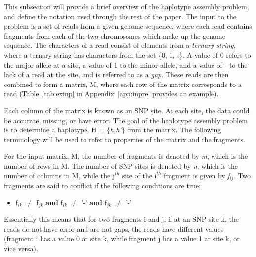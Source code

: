 \documentclass[10pt,twocolumn]{article}
\begin{document}
This subsection will provide a brief overview of the haplotype assembly problem, and define the
notation used through the rest of the paper. The input to the problem is a set of reads from a given genome
sequence, where each read contains fragments from each of the two chromosomes which make up the genome
sequence. The characters of a read consist of elements from a \textit{ternary string}, where a ternary
string has characters from the set \{0, 1, -\}. A value of 0 refers to the major allele
at a site, a value of 1 to the minor allele, and a value of - to the lack of a read at the site, and is
referred to as a \textit{gap}. These reads are then combined to form a matrix, M, where each row of the 
matrix corresponds to a read (Table~\ref{tab:exinp} in Appendix~\ref{app:inpre} provides an example). 

Each column of the matrix is known as an SNP site. At each site, the data could be accurate, missing, or have
error. The goal of the haplotype assembly problem is to determine a haplotype, H = \{\textit{h,h'}\}
from the matrix. The following terminology will be used to refer to properties of the matrix and the
fragments. 

For the input matrix, M, the number of fragments is denoted by \textit{m}, which is the number of rows in M.
The number of SNP sites is denoted by \textit{n}, which is the number of columns in M, while the j$^{th}$ 
site of the i$^{th}$ fragment is given by \textit{f$_{ij}$}. Two fragments are said to 
conflict if the following conditions are true:
\begin{itemize}
    \item{f$_{ik}$ $\neq$ f$_{jk}$ \textbf{and} f$_{ik}$ $\neq$ '-' \textbf{and} f$_{jk}$ $\neq$ '-' }
\end{itemize}
Essentially this means that for two fragments i and j, if at an SNP site k, the reads do not have error and are 
not gaps, the reads have different values (fragment i has a value 0 at site k, while fragment j has a value 
1 at site k, or vice versa). 
\end{document}

